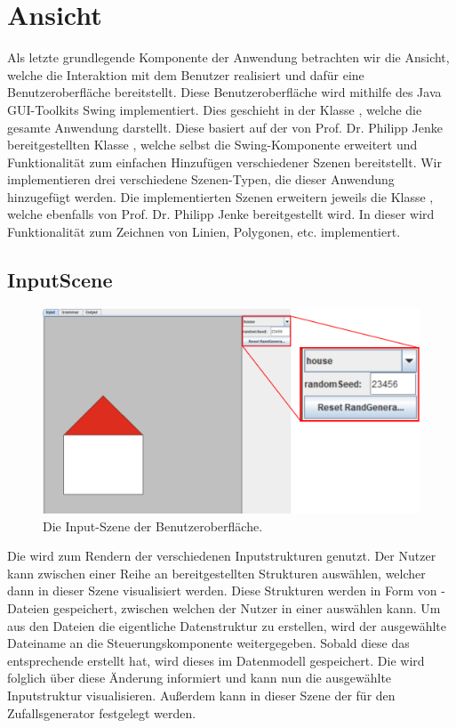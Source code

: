 \section{Ansicht}
Als letzte grundlegende Komponente der Anwendung betrachten wir die Ansicht, welche die Interaktion mit dem Benutzer realisiert und
dafür eine Benutzeroberfläche bereitstellt. Diese Benutzeroberfläche wird mithilfe des Java GUI-Toolkits Swing implementiert. Dies geschieht
in der Klasse , welche die gesamte Anwendung darstellt. Diese basiert auf der von Prof. Dr. Philipp Jenke
bereitgestellten Klasse , welche selbst die Swing-Komponente  erweitert und
Funktionalität zum einfachen Hinzufügen verschiedener Szenen bereitstellt. Wir implementieren drei verschiedene Szenen-Typen,
die dieser Anwendung hinzugefügt werden. Die implementierten Szenen erweitern jeweils die Klasse , welche ebenfalls
von Prof. Dr. Philipp Jenke bereitgestellt wird. In dieser wird Funktionalität zum Zeichnen von Linien, Polygonen, etc. implementiert.

\subsection{InputScene}

\begin{figure}[H]
    \centering
    \includegraphics[width=\textwidth*3/4]{images/input_scene.pdf}
    \caption{Die Input-Szene der Benutzeroberfläche.}
    \label{fig:input_scene}
\end{figure}

Die  wird zum Rendern der verschiedenen Inputstrukturen genutzt. Der Nutzer kann zwischen
einer Reihe an bereitgestellten Strukturen auswählen, welcher dann in dieser Szene visualisiert werden. Diese Strukturen werden
in Form von -Dateien gespeichert, zwischen welchen der Nutzer in einer  auswählen kann. Um aus den
Dateien die eigentliche Datenstruktur zu erstellen, wird der ausgewählte Dateiname an die Steuerungskomponente weitergegeben.
Sobald diese das entsprechende  erstellt hat, wird dieses im Datenmodell gespeichert. Die 
wird folglich über diese Änderung informiert und kann nun die ausgewählte Inputstruktur visualisieren.
Außerdem kann in dieser Szene der  für den Zufallsgenerator festgelegt werden.

